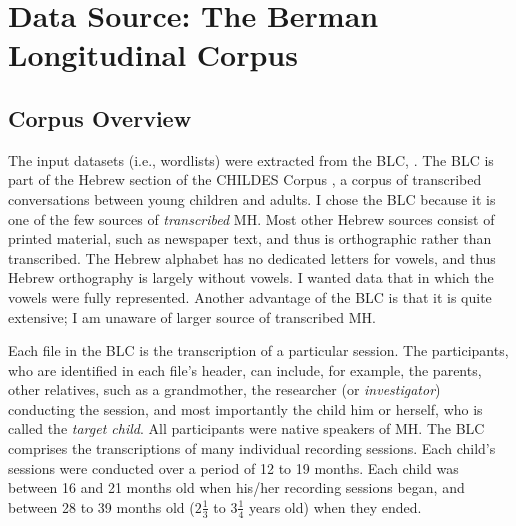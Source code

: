 \section{Data Source: The Berman Longitudinal Corpus}
\label{sec:datasource}
\subsection{Corpus Overview}
\label{sec:corpus-overview}
The input datasets (i.e., wordlists) were extracted 
from the \ac{BLC}, \citep{berman-weissenborn:1991}. 
The \ac{BLC} is part of the Hebrew section of the 
CHILDES Corpus \citep{macwhinney:2000a}, a corpus 
of transcribed conversations between young children 
and adults. I chose the \ac{BLC} because 
it is one of the few sources of \emph{transcribed} \ac{MH}. 
Most other Hebrew sources consist of printed material, 
such as newspaper text, and thus is orthographic 
rather than transcribed. The Hebrew alphabet has no 
dedicated letters for vowels, and thus Hebrew 
orthography is largely without vowels. I wanted data 
that in which the vowels were 
fully represented. Another advantage of the \ac{BLC} is that 
it is quite extensive; I am unaware of larger source of 
transcribed \ac{MH}. 

Each file in the \ac{BLC} is the transcription of a 
particular session. The participants, who are identified 
in each file's header, can include, for example, the parents,
 other relatives, such as a grandmother, 
the researcher (or \emph{investigator}) conducting the 
session, and most importantly the child him or herself, 
who is called the \emph{target child}. All participants 
were native speakers of \ac{MH}. The \ac{BLC} comprises 
the transcriptions of many individual recording sessions. 
Each child's sessions were conducted over a period of 
12 to 19 months. Each child was between 16 and 21 months 
old when his/her recording sessions began, and between 
28 to 39 months old ($2\frac{1}{3}$ to $3\frac{1}{4}$ 
years old) when they ended.

